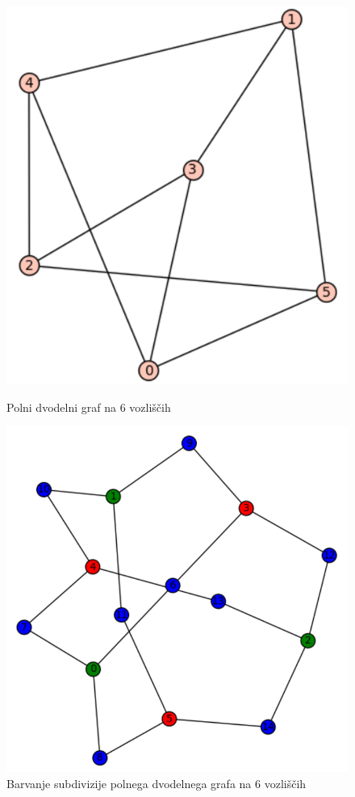 \documentclass[11pt,a4paper,titlepage]{article}
\begin{document}
\begin{figure}[h]
\centering
\begin{minipage}{0.45\textwidth}
	\centering
	\includegraphics[width=\linewidth]{dvodelni_graf.png}
	\caption{Polni dvodelni graf na 6 vozliščih}
\end{minipage}
\hfill
\begin{minipage}{0.45\textwidth}
	\centering
	\includegraphics[width=\linewidth]{subdivizija_dvodelni_graf.png}
	\caption{Barvanje subdivizije polnega dvodelnega grafa na 6 vozliščih}
\end{minipage}
\end{figure}
\end{document}
